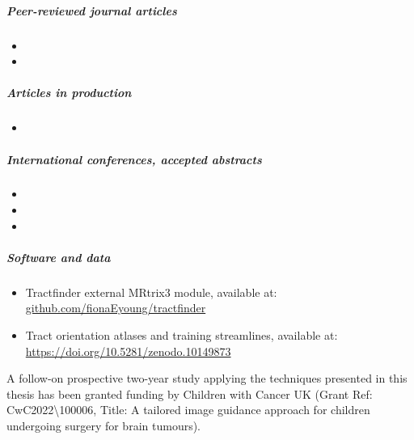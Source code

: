 \subparagraph*{Peer-reviewed journal articles}
\begin{itemize}
  \item[] 
  \item[] 
\end{itemize}
\subparagraph*{Articles in production}
\begin{itemize}
  \item[] 
\end{itemize}
\subparagraph*{International conferences, accepted abstracts}
\begin{itemize}
  \item[] 
  \item[] 
  \item[] 
\end{itemize}

\subparagraph*{Software and data}
\begin{itemize}
  \item[] Tractfinder external MRtrix3 module, available at: \url{github.com/fionaEyoung/tractfinder}
  \item[] Tract orientation atlases and training streamlines, available at: \url{https://doi.org/10.5281/zenodo.10149873}
\end{itemize}

\noindent A follow-on prospective two-year study applying the techniques presented in this thesis has been granted funding by Children with Cancer UK (Grant Ref: CwC2022\textbackslash100006, Title:  A tailored image guidance approach for children undergoing surgery for brain tumours).

